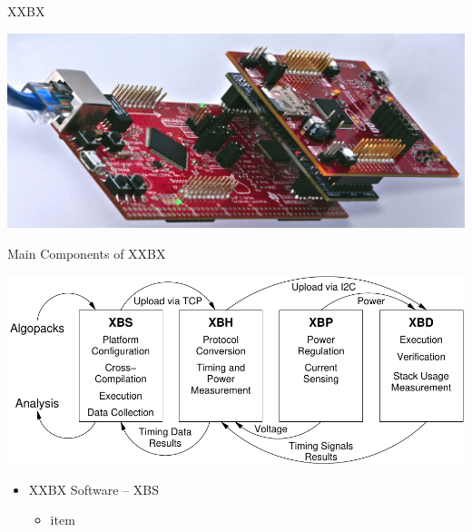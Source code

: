 \documentclass[xcolor=pdftex,dvipsnames,table,final]{beamer}
\begin{document}
\begin{frame}[fragile]{}
\begin{columns}[t, totalwidth=\textwidth]
\begin{column}{.675\linewidth}
\begin{columns}
\begin{column}{.473\linewidth}
      
      \begin{block}{XXBX}
        \begin{center}
          \includegraphics[scale=1.5]{../figures/xxbx-tilted}
        \end{center} 
      \end{block}
      \begin{block}{Main Components of XXBX}
        \begin{center}
          \includegraphics[scale=1.3]{../figures/xxbx_block}
        \end{center} 
        \begin{itemize}
          \item XXBX Software -- XBS 
          \begin{itemize}
            \item item 
          \end{itemize}

\end{itemize}
\end{block}
\end{column}
\end{columns}
\end{column}
\end{columns}
\end{frame}
\end{document}

